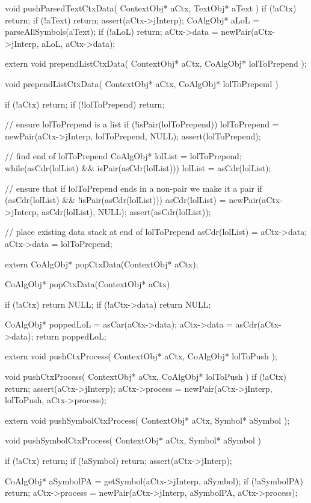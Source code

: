 \startCCode
void pushParsedTextCtxData(
  ContextObj* aCtx,
  TextObj* aText
) {
  if (!aCtx) return;
  if (!aText) return;
  assert(aCtx->jInterp);
  CoAlgObj* aLoL = parseAllSymbols(aText);
  if (!aLoL) return;
  aCtx->data = newPair(aCtx->jInterp, aLoL, aCtx->data);
}
\stopCCode

\startCHeader
extern void prependListCtxData(
  ContextObj* aCtx,
  CoAlgObj* lolToPrepend
);
\stopCHeader

\startCCode
void prependListCtxData(
  ContextObj* aCtx,
  CoAlgObj* lolToPrepend
) {
  if (!aCtx) return;
  if (!lolToPrepend) return;

  // ensure lolToPrepend is a list
  if (!isPair(lolToPrepend)) {
    lolToPrepend = newPair(aCtx->jInterp, lolToPrepend, NULL);
    assert(lolToPrepend);
  }

  // find end of lolToPrepend
  CoAlgObj* lolList = lolToPrepend;
  while(asCdr(lolList) && isPair(asCdr(lolList))) {
    lolList = asCdr(lolList);
  }

  // ensure that if lolToPrepend ends in a non-pair we make it a pair
  if (asCdr(lolList) && !isPair(asCdr(lolList))) {
    asCdr(lolList) = newPair(aCtx->jInterp, asCdr(lolList), NULL);
    assert(asCdr(lolList));
  }

  // place existing data stack at end of lolToPrepend
  asCdr(lolList) = aCtx->data;
  aCtx->data     = lolToPrepend;
}
\stopCCode

\startCHeader
extern CoAlgObj* popCtxData(ContextObj* aCtx);
\stopCHeader

\startCCode
CoAlgObj* popCtxData(ContextObj* aCtx) {
  if (!aCtx) return NULL;
  if (!aCtx->data) return NULL;

  CoAlgObj* poppedLoL = asCar(aCtx->data);
  aCtx->data          = asCdr(aCtx->data);
  return poppedLoL;
}
\stopCCode

\startCHeader
extern void pushCtxProcess(
  ContextObj* aCtx,
  CoAlgObj* lolToPush
);
\stopCHeader

\startCCode
void pushCtxProcess(
  ContextObj* aCtx,
  CoAlgObj* lolToPush
) {
  if (!aCtx) return;
  assert(aCtx->jInterp);
  aCtx->process = newPair(aCtx->jInterp, lolToPush, aCtx->process);
}
\stopCCode

\startCHeader
extern void pushSymbolCtxProcess(
  ContextObj* aCtx,
  Symbol* aSymbol
);
\stopCHeader

\startCCode
void pushSymbolCtxProcess(
  ContextObj* aCtx,
  Symbol* aSymbol
) {
  if (!aCtx) return;
  if (!aSymbol) return;
  assert(aCtx->jInterp);

  CoAlgObj* aSymbolPA =
    getSymbol(aCtx->jInterp, aSymbol);
  if (!aSymbolPA) return;
  aCtx->process = newPair(aCtx->jInterp, aSymbolPA, aCtx->process);
}
\stopCCode

